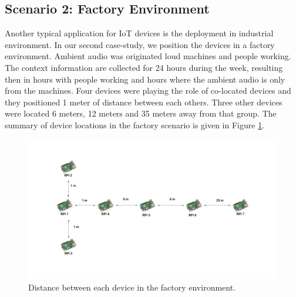 \subsection{Scenario 2: Factory Environment}
Another typical application for IoT devices is the deployment in industrial environment.
In our second case-study, we position the devices in a factory environment. 
Ambient audio was originated loud machines and people working.
The context information are collected for 24 hours during the week, resulting then in hours with people working and hours where the ambient audio is only from the machines.
Four devices were playing the role of co-located devices and they positioned 1 meter of distance between each others. Three other devices were located 6 meters, 12 meters and 35 meters away from that group. 
The summary of device locations in the factory scenario is given in Figure \ref{fig_devices_loacation}.

\begin{figure}[!h]
\centering
\includegraphics[width=6.5in]{images/devices_location.jpg}
\caption{Distance between each device in the factory environment.}
\label{fig_devices_loacation}
\end{figure}

